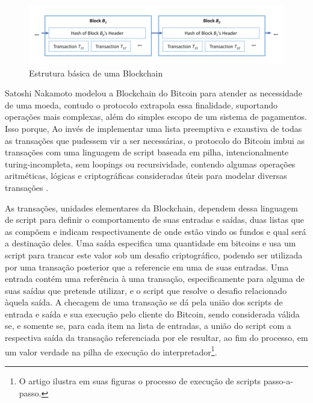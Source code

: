 \documentclass[a4paper,11pt]{article}
\begin{document}
\begin{figure}[htp]
    \centering
    \includegraphics[width=\textwidth]{images/exemplo-de-blockchain.png}
    \caption{Estrutura básica de uma Blockchain}
    \label{fig:blockchain}
\end{figure}

Satoshi Nakamoto modelou a Blockchain do Bitcoin para atender as necessidade de uma moeda, contudo o protocolo extrapola essa finalidade, suportando operações mais complexas, além do simples escopo de um sistema de pagamentos.
Isso porque, Ao invés de implementar uma lista preemptiva e exaustiva de todas as transações que pudessem vir a ser necessárias, o protocolo do Bitcoin imbui as transações com uma linguagem de script baseada em pilha, intencionalmente turing-incompleta, sem loopings ou recursividade, contendo algumas operações aritméticas, lógicas e criptográficas consideradas úteis para modelar diversas transações \cite{Narayanan2016a}.

As transações, unidades elementares da Blockchain, dependem dessa linguagem de script para definir o comportamento de suas entradas e saídas, duas listas que as compõem e indicam respectivamente de onde estão vindo os fundos e qual será a destinação deles.
Uma saída especifica uma quantidade em bitcoins e usa um script para trancar este valor sob um desafio criptográfico, podendo ser utilizada por uma transação posterior que a referencie em uma de suas entradas. Uma entrada contém uma referência à uma transação, especificamente para alguma de suas saídas que pretende utilizar, e o script que resolve o desafio relacionado àquela saída.
A checagem de uma transação se dá pela união dos scripts de entrada e saída e sua execução pelo cliente do Bitcoin, sendo considerada válida se, e somente se, para cada item na lista de entradas, a união do script com a respectiva saída da transação referenciada por ele resultar, ao fim do processo, em um valor verdade na pilha de execução do
interpretador\footnote{O artigo \cite{Bistarelli2019} ilustra em suas figuras o processo de execução de scripts passo-a-passo.}.
\end{document}
